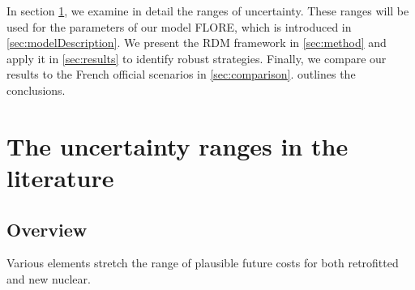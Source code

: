 In section \ref{sec:plausibleValues}, we examine in detail the ranges of uncertainty. These ranges will be used for the parameters of our model FLORE, which is introduced in \cref{sec:modelDescription}. We present the RDM framework in \cref{sec:method} and apply it in \cref{sec:results} to identify robust strategies. Finally, we compare our results to the French official scenarios in \cref{sec:comparison}.  outlines the conclusions.




\section{The uncertainty ranges in the literature}
\label{sec:plausibleValues}

\subsection{Overview}
Various elements stretch the range of plausible future costs for both retrofitted and new nuclear.

